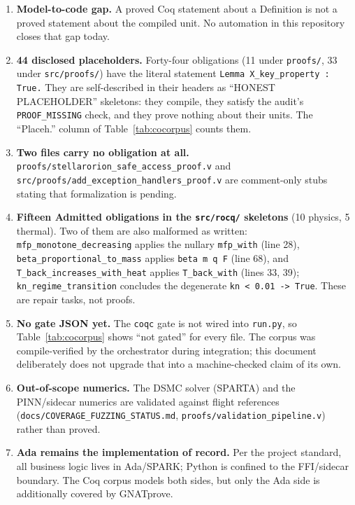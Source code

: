 \documentclass[11pt]{article}
\theoremstyle{definition}
\begin{document}
\begin{enumerate}
\item \textbf{Model-to-code gap.} A proved Coq statement about a Definition
is not a proved statement about the compiled unit. No automation in this
repository closes that gap today.
\item \textbf{44 disclosed placeholders.} Forty-four obligations (11 under
\texttt{proofs/}, 33 under \texttt{src/proofs/}) have the literal statement
\texttt{Lemma X\_key\_property : True.} They are self-described in their
headers as ``HONEST PLACEHOLDER'' skeletons: they compile, they satisfy the
audit's \texttt{PROOF\_MISSING} check, and they prove nothing about their
units. The ``Placeh.'' column of Table~\ref{tab:cocorpus} counts them.
\item \textbf{Two files carry no obligation at all.}
\texttt{proofs/stellarorion\_safe\_access\_proof.v} and
\texttt{src/proofs/add\_exception\_handlers\_proof.v} are comment-only
stubs stating that formalization is pending.
\item \textbf{Fifteen Admitted obligations in the \texttt{src/rocq/}
skeletons} (10 physics, 5 thermal). Two of them are also malformed as
written: \texttt{mfp\_monotone\_decreasing} applies the nullary
\texttt{mfp\_with} (line 28), \texttt{beta\_proportional\_to\_mass} applies
\texttt{beta m q F} (line 68), and \texttt{T\_back\_increases\_with\_heat}
applies \texttt{T\_back\_with} (lines 33, 39);
\texttt{kn\_regime\_transition} concludes the degenerate
\texttt{kn < 0.01 -> True}. These are repair tasks, not proofs.
\item \textbf{No gate JSON yet.} The \texttt{coqc} gate is not wired into
\texttt{run.py}, so Table~\ref{tab:cocorpus} shows ``not gated'' for every
file. The corpus was compile-verified by the orchestrator during
integration; this document deliberately does not upgrade that into a
machine-checked claim of its own.
\item \textbf{Out-of-scope numerics.} The DSMC solver (SPARTA) and the
PINN/sidecar numerics are validated against flight references
(\texttt{docs/COVERAGE\_FUZZING\_STATUS.md},
\texttt{proofs/validation\_pipeline.v}) rather than proved.
\item \textbf{Ada remains the implementation of record.} Per the project
standard, all business logic lives in Ada/SPARK; Python is confined to the
FFI/sidecar boundary. The Coq corpus models both sides, but only the Ada
side is additionally covered by GNATprove.
\end{enumerate}
\end{document}
